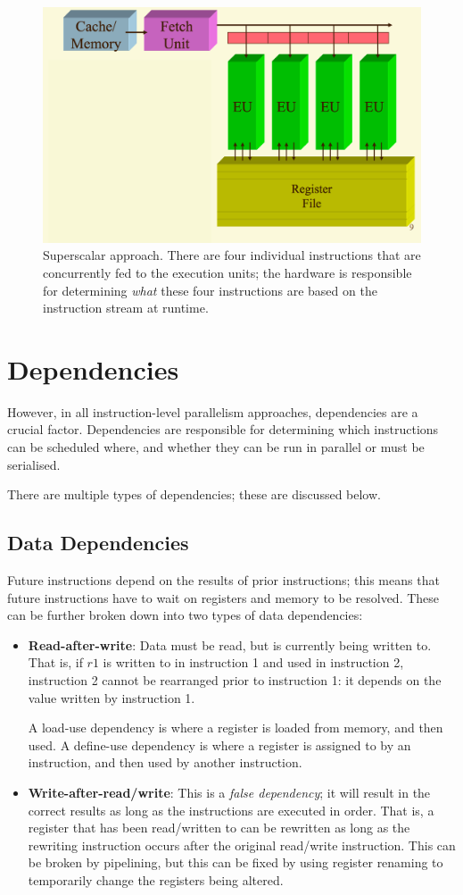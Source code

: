 \begin{figure}
\centering
\includegraphics[width=0.7\linewidth]{screenshot068}
\caption[Superscalar approach.]{Superscalar approach. There are four individual instructions that are concurrently fed to the execution units; the hardware is responsible for determining \textit{what} these four instructions are based on the instruction stream at runtime.}
\label{fig:screenshot068}
\end{figure}

\section{Dependencies}
\label{sec:dependencies}
However, in all instruction-level parallelism approaches, dependencies are a crucial factor. Dependencies are responsible for determining which instructions can be scheduled where, and whether they can be run in parallel or must be serialised.

There are multiple types of dependencies; these are discussed below.

\subsection{Data Dependencies}
Future instructions depend on the results of prior instructions; this means that future instructions have to wait on registers and memory to be resolved. These can be further broken down into two types of data dependencies: \begin{itemize}
\item \textbf{Read-after-write}: Data must be read, but is currently being written to. That is, if $r1$ is written to in instruction 1 and used in instruction 2, instruction 2 cannot be rearranged prior to instruction 1: it depends on the value written by instruction 1.

A load-use dependency is where a register is loaded from memory, and then used. A define-use dependency is where a register is assigned to by an instruction, and then used by another instruction.

\item \textbf{Write-after-read/write}: This is a \textit{false dependency}; it will result in the correct results as long as the instructions are executed in order. That is, a register that has been read/written to can be rewritten as long as the rewriting instruction occurs after the original read/write instruction. This can be broken by pipelining, but this can be fixed by using register renaming to temporarily change the registers being altered.
\end{itemize}

